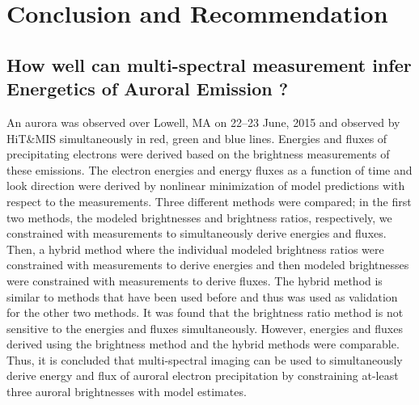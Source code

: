 \documentclass[crop=false,class=mitthesis,oneside,font=12pt]{standalone}
\begin{document}
\chapter{Conclusion and Recommendation}

\section{How well can multi-spectral measurement infer Energetics of Auroral Emission ?}
An aurora was observed over Lowell, MA on 22–23 June, 2015 and observed by HiT\&MIS simultaneously in red, green and blue lines.  Energies and fluxes of precipitating electrons were derived based on the brightness measurements of these emissions. The electron energies and energy fluxes as a function of time and look direction were derived by nonlinear minimization of model predictions with respect to the measurements. Three different methods were compared; in the first two methods, the modeled brightnesses and brightness ratios, respectively, we constrained with measurements to simultaneously derive energies and fluxes. Then, a hybrid method where the individual modeled brightness ratios were constrained with measurements to derive energies and then  modeled brightnesses were constrained with measurements to derive fluxes.  The hybrid method is similar to methods that have been used before and thus was used as validation for the other two methods. It was found that the brightness ratio method is not sensitive to the energies and fluxes simultaneously. However, energies and fluxes derived using the brightness method and the hybrid methods were comparable.  Thus, it is concluded that multi-spectral imaging can be used to simultaneously derive energy and flux of auroral electron precipitation by constraining at-least three auroral brightnesses with model estimates.


\end{document}
